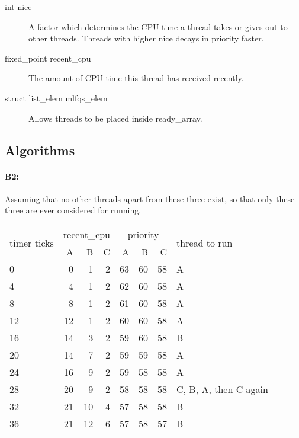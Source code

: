 \begin{description}
  \begin{description}

  \item[int nice] A factor which determines the CPU time a thread takes or gives
    out to other threads. Threads with higher nice decays in priority faster.

  \item[fixed\_point recent\_cpu] The amount of CPU time this thread has received
    recently.

  \item[struct list\_elem mlfqs\_elem] Allows threads to be placed inside
    ready\_array.

  \end{description}

\end{description}

\subsection{Algorithms}
\paragraph{B2:} %

Assuming that no other threads apart from these three exist, so that only these
three are ever considered for running.

\begin{tabular}{ | l | r r r | r r r | l | }
  \hline
  \multirow{2}{*}{timer ticks} & \multicolumn{3}{|c|}{recent\_cpu} &
    \multicolumn{3}{|c|}{priority} & \multirow{2}{*}{thread to run} \\
     & A  & B & C & A  & B  & C  &   \\
  \hline
  0  & 0  & 1  & 2 & 63 & 60 & 58 & A                     \\
  4  & 4  & 1  & 2 & 62 & 60 & 58 & A                     \\
  8  & 8  & 1  & 2 & 61 & 60 & 58 & A                     \\
  12 & 12 & 1  & 2 & 60 & 60 & 58 & A \and B              \\
  16 & 14 & 3  & 2 & 59 & 60 & 58 & B                     \\
  20 & 14 & 7  & 2 & 59 & 59 & 58 & A \and B              \\
  24 & 16 & 9  & 2 & 59 & 58 & 58 & A                     \\
  28 & 20 & 9  & 2 & 58 & 58 & 58 & C, B, A, then C again \\
  32 & 21 & 10 & 4 & 57 & 58 & 58 & B \and C              \\
  36 & 21 & 12 & 6 & 57 & 58 & 57 & B                     \\
  \hline
\end{tabular}

